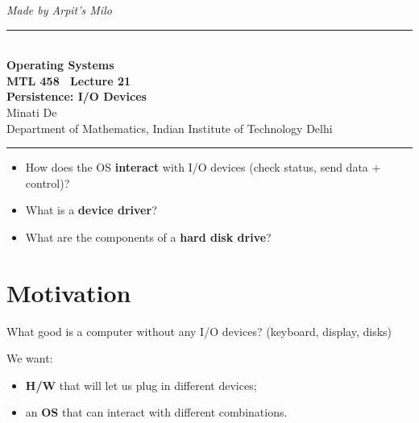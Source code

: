 \documentclass[11pt,a4paper]{article}
\begin{document}
\begin{center}
{\small\itshape Made by Arpit's Milo}\\[0.3em]
{\color{rulegray}\rule{\textwidth}{1.1pt}}\\[0.45em]
{\LARGE\bfseries Operating Systems}\\[0.25em]
{\Large\bfseries MTL 458 \textperiodcentered\ Lecture 21}\\[0.35em]
{\LARGE\bfseries Persistence: I/O Devices}\\[0.35em]
{\large Minati De}\\[0.15em]
{\normalsize Department of Mathematics, Indian Institute of Technology Delhi}\\[0.35em]
{\color{rulegray}\rule{\textwidth}{1.1pt}}
\end{center}

\vspace{0.4em}
\begin{keybox}
\begin{itemize}
  \item How does the OS \textbf{interact} with I/O devices (check status, send
        data + control)?
  \item What is a \textbf{device driver}?
  \item What are the components of a \textbf{hard disk drive}?
\end{itemize}
\end{keybox}

\tableofcontents
\vspace{0.6em}
\noindent{\color{rulegray}\rule{\textwidth}{0.4pt}}

\section{Motivation}

What good is a computer without any I/O devices? (keyboard, display, disks)

\noindent We want:
\begin{itemize}
  \item \textbf{H/W} that will let us plug in different devices;
  \item an \textbf{OS} that can interact with different combinations.
\end{itemize}
\end{document}
